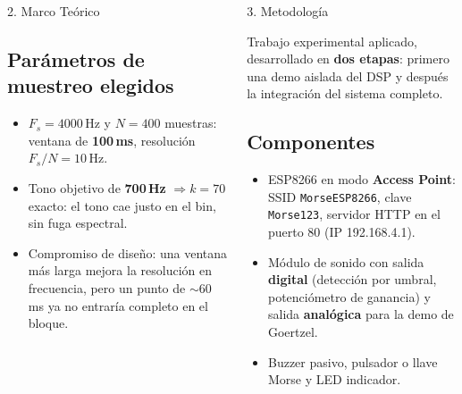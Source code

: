 \documentclass[final]{beamer}
\newlength{\onecolwid}
\newlength{\twocolwid}
\begin{document}
\begin{frame}[t]
\begin{columns}[t]
\begin{column}{\twocolwid}
\begin{columns}[t,totalwidth=\twocolwid]
\begin{column}{\onecolwid}
\begin{block}{2. Marco Teórico}
\subsection*{Parámetros de muestreo elegidos}
\begin{itemize}
\item $F_s = 4000$\,Hz y $N = 400$ muestras: ventana de \textbf{100\,ms}, resolución $F_s/N = 10$\,Hz.
\item Tono objetivo de \textbf{700\,Hz} $\Rightarrow k = 70$ exacto: el tono cae justo en el bin, sin fuga espectral.
\item Compromiso de diseño: una ventana más larga mejora la resolución en frecuencia, pero un punto de $\sim$60\,ms ya no entraría completo en el bloque.
\end{itemize}

\end{block}


\end{column}

\begin{column}{\onecolwid}\vspace{-.6in}

\begin{block}{3. Metodología}

Trabajo experimental aplicado, desarrollado en \textbf{dos etapas}: primero una demo aislada del DSP y después la integración del sistema completo.

\subsection*{Componentes}
\begin{itemize}
\item ESP8266 en modo \textbf{Access Point}: SSID \texttt{MorseESP8266}, clave \texttt{Morse123}, servidor HTTP en el puerto 80 (IP 192.168.4.1).
\item Módulo de sonido con salida \textbf{digital} (detección por umbral, potenciómetro de ganancia) y salida \textbf{analógica} para la demo de Goertzel.
\item Buzzer pasivo, pulsador o llave Morse y LED indicador.
\end{itemize}


\end{block}
\end{column}
\end{columns}
\end{column}
\end{columns}
\end{frame}
\end{document}
